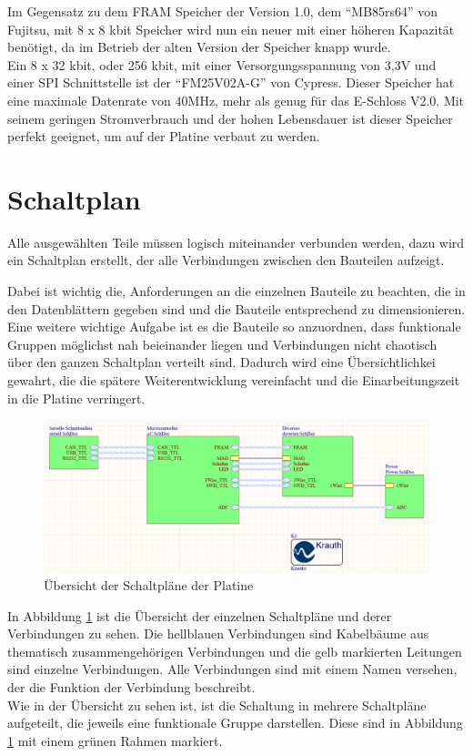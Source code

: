 Im Gegensatz zu dem \ac{FRAM} Speicher der Version 1.0, dem \enquote{MB85rs64} von Fujitsu, mit 8 x 8 kbit
Speicher wird nun ein neuer mit einer höheren Kapazität benötigt, da im Betrieb der alten Version der Speicher
knapp wurde. \\
Ein 8 x 32 kbit, oder 256 kbit, mit einer Versorgungsspannung von 3,3V und einer \ac{SPI} Schnittstelle ist
der \enquote{FM25V02A-G} von Cypress. Dieser Speicher hat eine maximale Datenrate von 40MHz, mehr als genug für
das E-Schloss V2.0. Mit seinem geringen Stromverbrauch und der hohen Lebensdauer ist dieser Speicher perfekt
geeignet, um auf der Platine verbaut zu werden.

\clearpage

\section{Schaltplan}
Alle ausgewählten Teile müssen logisch miteinander verbunden werden, dazu wird ein Schaltplan erstellt, der alle
Verbindungen zwischen den Bauteilen aufzeigt.

Dabei ist wichtig die, Anforderungen an die einzelnen Bauteile zu beachten, die in den Datenblättern gegeben sind und
die Bauteile entsprechend zu dimensionieren. Eine weitere wichtige Aufgabe ist es die Bauteile so anzuordnen, dass
funktionale Gruppen möglichst nah beieinander liegen und Verbindungen nicht chaotisch über den ganzen Schaltplan
verteilt sind. Dadurch wird eine Übersichtlichkei gewahrt, die die spätere Weiterentwicklung vereinfacht und
die Einarbeitungszeit in die Platine verringert.
\begin{figure}[H]
    \centering
    \includegraphics[width=1\textwidth]{resources/images/SP_Uebersicht.png}
    \caption[Schaltplan Übersicht]{Übersicht der Schaltpläne der Platine}
    \label{fig:sp_uebersicht}
\end{figure}
In Abbildung \ref{fig:sp_uebersicht} ist die Übersicht der einzelnen Schaltpläne und derer Verbindungen zu sehen.
Die hellblauen Verbindungen sind Kabelbäume aus thematisch zusammengehörigen Verbindungen und die gelb markierten
Leitungen sind einzelne Verbindungen. Alle Verbindungen sind mit einem Namen versehen, der die Funktion der Verbindung
beschreibt. \\
Wie in der Übersicht zu sehen ist, ist die Schaltung in mehrere Schaltpläne aufgeteilt, die jeweils eine
funktionale Gruppe darstellen. Diese sind in Abbildung \ref{fig:sp_uebersicht} mit einem grünen Rahmen markiert.

